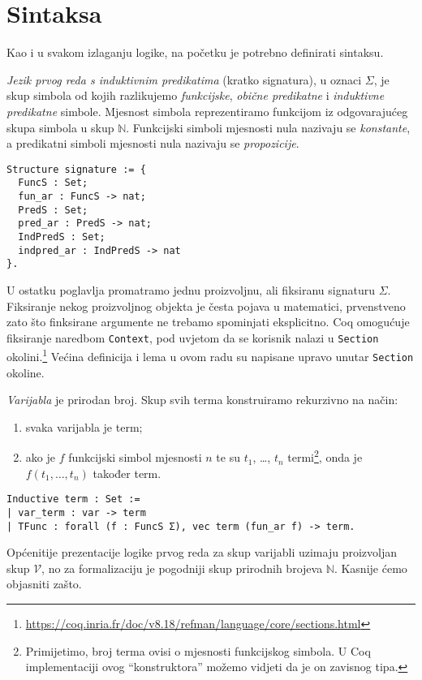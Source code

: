 \section{Sintaksa}\label{sec:sintaksa}
Kao i u svakom izlaganju logike, na početku je potrebno definirati sintaksu.
\begin{definition}[Signatura]\label{def:signatura}
  \textit{Jezik prvog reda s induktivnim predikatima} (kratko signatura), u oznaci \(\Sigma\),
  je skup simbola od kojih razlikujemo \textit{funkcijske}, \textit{obične predikatne}
  i \textit{induktivne predikatne} simbole.
  Mjesnost simbola reprezentiramo funkcijom iz odgovarajućeg skupa simbola u skup \(\mathbb{N}\).
  Funkcijski simboli mjesnosti nula nazivaju se \textit{konstante},
  a predikatni simboli mjesnosti nula nazivaju se \textit{propozicije}.
  \begin{verbatim}
Structure signature := {
  FuncS : Set;
  fun_ar : FuncS -> nat;
  PredS : Set;
  pred_ar : PredS -> nat;
  IndPredS : Set;
  indpred_ar : IndPredS -> nat
}.
\end{verbatim}
\end{definition}

\begin{example}
\end{example}

\noindent U ostatku poglavlja promatramo jednu proizvoljnu, ali fiksiranu signaturu \(\Sigma\).
Fiksiranje nekog proizvoljnog objekta je česta pojava u matematici,
prvenstveno zato što finksirane argumente ne trebamo spominjati eksplicitno.
Coq omogućuje fiksiranje naredbom \texttt{Context},
pod uvjetom da se korisnik nalazi u \texttt{Section} okolini.\footnote{\url{https://coq.inria.fr/doc/v8.18/refman/language/core/sections.html}}
Većina definicija i lema u ovom radu su napisane upravo unutar \texttt{Section} okoline.

\begin{definition}[Term]\label{def:term}
  \textit{Varijabla} je prirodan broj. Skup svih terma konstruiramo rekurzivno na način:
  \begin{enumerate}
  \item svaka varijabla je term;
  \item ako je \(f\) funkcijski simbol mjesnosti \(n\) te su \(t_{1}\), \ldots, \(t_{n}\) termi\footnote{Primijetimo, broj terma ovisi o mjesnosti funkcijskog simbola. U Coq implementaciji ovog \enquote{konstruktora} možemo vidjeti da je on zavisnog tipa.},
    onda je \(f(t_{1}, \ldots, t_{n})\) također term.
  \end{enumerate}
\begin{verbatim}
Inductive term : Set :=
| var_term : var -> term 
| TFunc : forall (f : FuncS Σ), vec term (fun_ar f) -> term.
\end{verbatim}
\end{definition}
Općenitije prezentacije logike prvog reda za skup varijabli uzimaju proizvoljan skup \(\mathcal{V}\),
no za formalizaciju je pogodniji skup prirodnih brojeva \(\mathbb{N}\).
Kasnije ćemo objasniti zašto.


